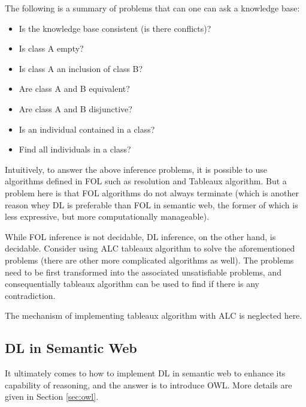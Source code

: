 The following is a summary of problems that can one can ask a knowledge base:
\begin{itemize}
	\item Is the knowledge base consistent (is there conflicts)?
	\item Is class A empty?
	\item Is class A an inclusion of class B?
	\item Are class A and B equivalent?
	\item Are class A and B disjunctive?
	\item Is an individual contained in a class?
	\item Find all individuals in a class?
\end{itemize}
Intuitively, to answer the above inference problems, it is possible to use algorithms defined in FOL such as resolution and Tableaux algorithm. But a problem here is that FOL algorithms do not always terminate (which is another reason whey DL is preferable than FOL in semantic web, the former of which is less expressive, but more computationally manageable).

While FOL inference is not decidable, DL inference, on the other hand, is decidable. Consider using ALC tableaux algorithm to solve the aforementioned problems (there are other more complicated algorithms as well). The problems need to be first transformed into the associated unsatisfiable problems, and consequentially tableaux algorithm can be used to find if there is any contradiction.

The mechanism of implementing tableaux algorithm with ALC is neglected here.

\subsection{DL in Semantic Web}

It ultimately comes to how to implement DL in semantic web to enhance its capability of reasoning, and the answer is to introduce OWL. More details are given in Section \ref{sec:owl}.

















